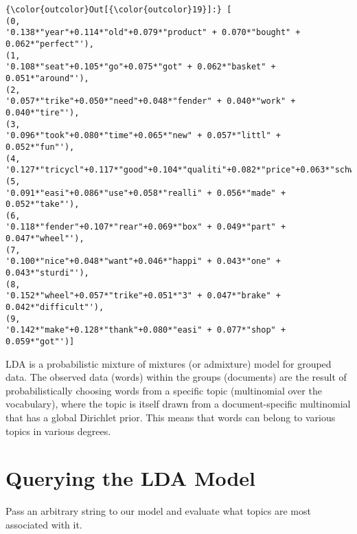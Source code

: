 \documentclass[a4paper,11pt]{article}
\begin{document}
            \begin{Verbatim}[commandchars=\\\{\}]
{\color{outcolor}Out[{\color{outcolor}19}]:} [
(0,
'0.138*"year"+0.114*"old"+0.079*"product" + 0.070*"bought" + 0.062*"perfect"'),
(1,
'0.108*"seat"+0.105*"go"+0.075*"got" + 0.062*"basket" + 0.051*"around"'),
(2,
'0.057*"trike"+0.050*"need"+0.048*"fender" + 0.040*"work" + 0.040*"tire"'),
(3,
'0.096*"took"+0.080*"time"+0.065*"new" + 0.057*"littl" + 0.052*"fun"'),
(4,
'0.127*"tricycl"+0.117*"good"+0.104*"qualiti"+0.082*"price"+0.063*"schwinn"'),
(5,
'0.091*"easi"+0.086*"use"+0.058*"realli" + 0.056*"made" + 0.052*"take"'),
(6,
'0.118*"fender"+0.107*"rear"+0.069*"box" + 0.049*"part" + 0.047*"wheel"'),
(7,
'0.100*"nice"+0.048*"want"+0.046*"happi" + 0.043*"one" + 0.043*"sturdi"'),
(8,
'0.152*"wheel"+0.057*"trike"+0.051*"3" + 0.047*"brake" + 0.042*"difficult"'),
(9,
'0.142*"make"+0.128*"thank"+0.080*"easi" + 0.077*"shop" + 0.059*"got"')]
\end{Verbatim}
        
    LDA is a probabilistic mixture of mixtures (or admixture) model for
grouped data. The observed data (words) within the groups (documents)
are the result of probabilistically choosing words from a specific topic
(multinomial over the vocabulary), where the topic is itself drawn from
a document-specific multinomial that has a global Dirichlet prior. This
means that words can belong to various topics in various degrees.

\section{Querying the LDA Model}\label{querying-the-lda-model}

Pass an arbitrary string to our model and evaluate what topics are most
associated with it.
\end{document}
